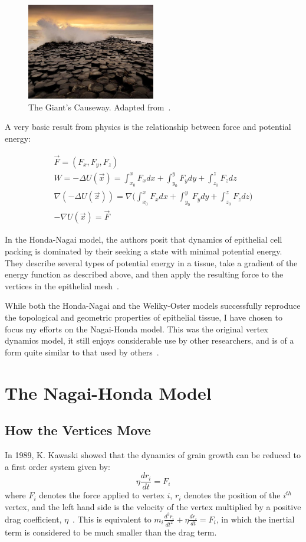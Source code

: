 \begin{figure}[h]
\centering
\includegraphics[width=0.5\textwidth]{../diagrams/resize_giant.jpg}
\caption{The Giant's Causeway. Adapted from~\cite{Giant}.}
\label{fig:cause}
\end{figure}

A very basic result from physics is the relationship between force and potential energy:

\begin{gather}
\vec{F} = (F_x, F_y, F_z)\\
W = -\Delta U(\vec{x}) = \int_{x_0}^xF_xdx+\int_{y_0}^yF_ydy+\int_{z_0}^zF_zdz\\
\nabla(-\Delta U(\vec{x})) = \nabla\Bigg(\int_{x_0}^xF_xdx+\int_{y_0}^yF_ydy+\int_{z_0}^zF_zdz\Bigg)\\
-\nabla U(\vec{x}) = \vec{F}
\end{gather}

In the Honda-Nagai model, the authors posit that dynamics of epithelial cell packing is dominated by their seeking a state with minimal potential energy. They describe several types of potential energy in a tissue, take a gradient of the energy function as described above, and then apply the resulting force to the vertices in the epithelial mesh~\cite{HondaNagai}.

While both the Honda-Nagai and the Weliky-Oster models successfully reproduce the topological and geometric properties of epithelial tissue, I have chosen to focus my efforts on the Nagai-Honda model. This was the original vertex dynamics model, it still enjoys considerable use by other researchers, and is of a form quite similar to that used by others~\cite{Farhadifar}.

\section{The Nagai-Honda Model}
\label{sec:force}
\subsection{How the Vertices Move}
In 1989, K. Kawaski showed that the dynamics of grain growth can be reduced to a first order system given by:
\begin{equation}
\label{eq:motion}
\eta\frac{dr_i}{dt} = F_i
\end{equation}
where $F_i$ denotes the force applied to vertex $i$, $r_i$ denotes the position of the $i^{th}$ vertex,  and the left hand side is the velocity of the vertex multiplied by a positive drag coefficient, $\eta$~\cite{1989Kawasaki}. This is equivalent to $m_i\frac{d^2r_i}{dt^2} + \eta\frac{dr_i}{dt} = F_i$, in which the 
inertial term is considered to be much smaller than the drag term.


